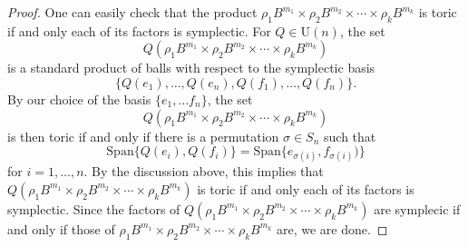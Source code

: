 \documentclass[10pt,a4paper]{amsart}
\begin{document}
\begin{proof}
One can easily check that the product $\rho_1B^{m_1} \times \rho_2 B^{m_2} \times \cdots \times \rho_k B^{m_k}$ is toric if and only each of its factors is symplectic.  For  $Q \in \mathrm{U}(n)$, the set $$Q(\rho_1B^{m_1} \times \rho_2 B^{m_2} \times \cdots \times \rho_k B^{m_k})$$
is a standard product of balls with respect to the symplectic basis $$\{Q(e_1), \dots, Q(e_n), Q(f_1), \dots, Q(f_n)\}.$$ By our choice of the basis $\{e_1, \dots f_n\}$, the set $$Q(\rho_1B^{m_1} \times \rho_2 B^{m_2} \times \cdots \times \rho_k B^{m_k})$$ is then toric if and only if there is a permutation $\sigma \in S_n$ such that $$\mathrm{Span}\{Q(e_i), Q(f_i)\} = \mathrm{Span}\{e_{\sigma(i)}, f_{\sigma(i)})\}$$ for $i=1, \dots,n$. By the discussion above, this implies that $Q(\rho_1B^{m_1} \times \rho_2 B^{m_2} \times \cdots \times \rho_k B^{m_k})$
is toric if and only each of its factors is symplectic. Since the factors of $Q(\rho_1B^{m_1} \times \rho_2 B^{m_2} \times \cdots \times \rho_k B^{m_k})$ are symplecic if and only if those of $\rho_1B^{m_1} \times \rho_2 B^{m_2} \times \cdots \times \rho_k B^{m_k}$ are, we are done.
\end{proof}
\end{document}
